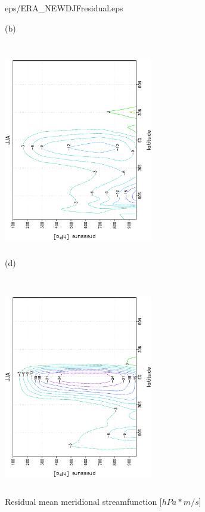 \documentclass[12pt,a4paper,twoside,openright,headinclude,liststotoc,bibtotoc]{scrreprt}
\begin{document}
\begin{figure}[c]
{{eps/ERA_NEWDJFresidual.eps}
}
\parbox{8.5cm}{\hspace{1.05cm}\begin{scriptsize}(b)\end{scriptsize} \vspace{-0.5cm} \\
\includegraphics[height=8.5cm,width=6.5cm,angle=-90]
{eps/NEWtmJJAresidual.eps}
}
\parbox{8.5cm}{\hspace{1.05cm}\begin{scriptsize}(d)\end{scriptsize} \vspace{-0.55cm} \\
\includegraphics[height=8.7cm,width=6.5cm,angle=-90]
{eps/ERA_NEWJJAresidual.eps}
}
\caption[Residual mean meridional streamfunction]{Residual mean meridional streamfunction [$hPa*m/s$]}
\label{img:resi}
\end{figure}
\end{document}

